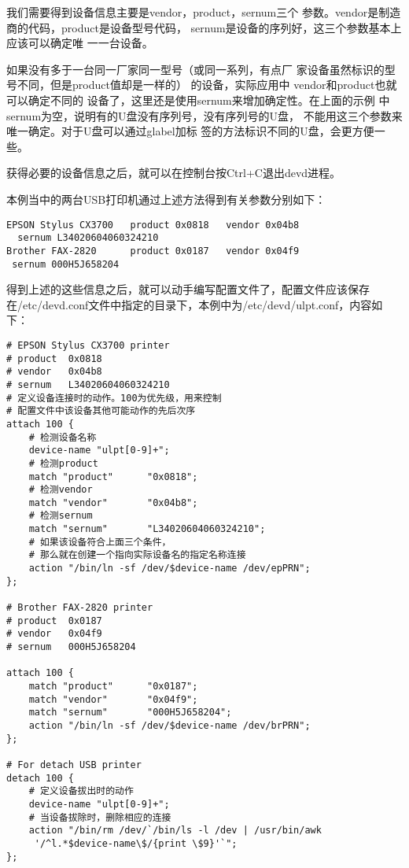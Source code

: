 我们需要得到设备信息主要是vendor，product，sernum三个
参数。vendor是制造商的代码，product是设备型号代码，
sernum是设备的序列好，这三个参数基本上应该可以确定唯
一一台设备。

如果没有多于一台同一厂家同一型号（或同一系列，有点厂
家设备虽然标识的型号不同，但是product值却是一样的）
的设备，实际应用中 vendor和product也就可以确定不同的
设备了，这里还是使用sernum来增加确定性。在上面的示例
中sernum为空，说明有的U盘没有序列号，没有序列号的U盘，
不能用这三个参数来唯一确定。对于U盘可以通过glabel加标
签的方法标识不同的U盘，会更方便一些。

获得必要的设备信息之后，就可以在控制台按Ctrl+C退出devd进程。

本例当中的两台USB打印机通过上述方法得到有关参数分别如下：
\begin{lstlisting}
EPSON Stylus CX3700   product 0x0818   vendor 0x04b8 
  sernum L34020604060324210
Brother FAX-2820      product 0x0187   vendor 0x04f9  
 sernum 000H5J658204
\end{lstlisting}


得到上述的这些信息之后，就可以动手编写配置文件了，配置文件应该保存在/etc/devd.conf文件中指定的目录下，本例中为/etc/devd/ulpt.conf，内容如下：
\begin{lstlisting}
# EPSON Stylus CX3700 printer
# product  0x0818
# vendor   0x04b8
# sernum   L34020604060324210
# 定义设备连接时的动作。100为优先级，用来控制
# 配置文件中该设备其他可能动作的先后次序
attach 100 {                                              
	# 检测设备名称
	device-name "ulpt[0-9]+";
	# 检测product                           
	match "product"      "0x0818";
	# 检测vendor
	match "vendor"       "0x04b8";
	# 检测sernum
	match "sernum"       "L34020604060324210";
	# 如果该设备符合上面三个条件，
	# 那么就在创建一个指向实际设备名的指定名称连接
	action "/bin/ln -sf /dev/$device-name /dev/epPRN";   
};

# Brother FAX-2820 printer
# product  0x0187
# vendor   0x04f9
# sernum   000H5J658204

attach 100 {
	match "product"      "0x0187";
	match "vendor"       "0x04f9";
	match "sernum"       "000H5J658204";
	action "/bin/ln -sf /dev/$device-name /dev/brPRN";
};

# For detach USB printer
detach 100 {
	# 定义设备拔出时的动作
	device-name "ulpt[0-9]+";
	# 当设备拔除时，删除相应的连接
	action "/bin/rm /dev/`/bin/ls -l /dev | /usr/bin/awk
	 '/^l.*$device-name\$/{print \$9}'`";
};
\end{lstlisting}

